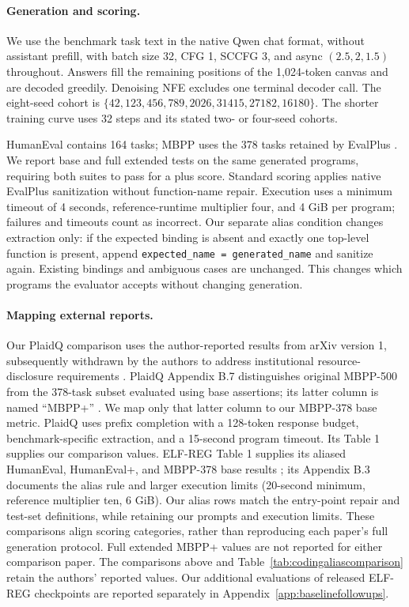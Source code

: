 \documentclass{article}
\newcommand{\reviewrev}[1]{{\color{blue}#1}}
\begin{document}
\paragraph{Generation and scoring.}
We use the benchmark task text in the native Qwen chat format, without assistant prefill, with batch size 32, CFG 1, SCCFG 3, and async $(2.5,2,1.5)$ throughout. Answers fill the remaining positions of the 1,024-token canvas and are decoded greedily. Denoising NFE excludes one terminal decoder call. The eight-seed cohort is $\{42,123,456,789,2026,31415,27182,16180\}$. The shorter training curve uses 32 steps and its stated two- or four-seed cohorts.

HumanEval \citep{humaneval} contains 164 tasks; MBPP \citep{mbpp} uses the 378 tasks retained by EvalPlus \citep{evalplus}. We report base and full extended tests on the same generated programs, requiring both suites to pass for a plus score. Standard scoring applies native EvalPlus sanitization without function-name repair. Execution uses a minimum timeout of 4 seconds, reference-runtime multiplier four, and 4 GiB per program; failures and timeouts count as incorrect. Our separate alias condition changes extraction only: if the expected binding is absent and exactly one top-level function is present, append \texttt{expected\_name = generated\_name} and sanitize again. Existing bindings and ambiguous cases are unchanged. This changes which programs the evaluator accepts without changing generation.

\paragraph{Mapping external reports.}
Our PlaidQ comparison uses the author-reported results from arXiv version 1, subsequently withdrawn by the authors to address institutional resource-disclosure requirements \citep{plaidq}. PlaidQ Appendix B.7 distinguishes original MBPP-500 from the 378-task subset evaluated using base assertions; its latter column is named ``MBPP+'' \citep{plaidq}. We map only that latter column to our MBPP-378 base metric. PlaidQ uses prefix completion with a 128-token response budget, benchmark-specific extraction, and a 15-second program timeout. Its Table 1 supplies our comparison values. ELF-REG Table 1 supplies its aliased HumanEval, HumanEval+, and MBPP-378 base results \citep{scalingdlm}; its Appendix B.3 documents the alias rule and larger execution limits (20-second minimum, reference multiplier ten, 6 GiB). Our alias rows match the entry-point repair and test-set definitions, while retaining our prompts and execution limits. These comparisons align scoring categories, rather than reproducing each paper's full generation protocol. Full extended MBPP+ values are not reported for either comparison paper. \reviewrev{The comparisons above and Table~\ref{tab:codingaliascomparison} retain the authors' reported values. Our additional evaluations of released ELF-REG checkpoints are reported separately in Appendix~\ref{app:baselinefollowups}.}
\end{document}

